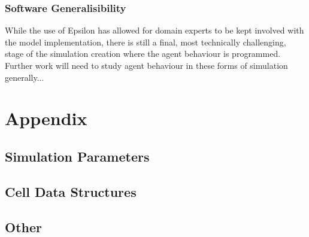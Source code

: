 \documentclass{UoYCSproject}
\begin{document}
\subsection{Software Generalisibility}%
While the use of Epsilon has allowed for domain experts to be kept involved with the model implementation, there is still a final, most technically challenging, stage of the simulation creation where the agent behaviour is programmed.
Further work will need to study agent behaviour in these forms of simulation generally...

\printbibliography
\chapter{Appendix}
\section{Simulation Parameters}


\section{Cell Data Structures}

\section{Other}
\end{document}
